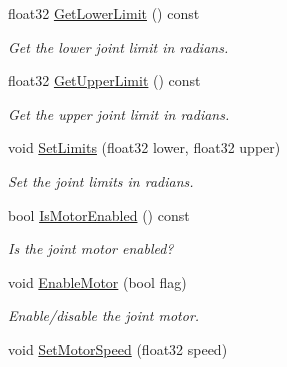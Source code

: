 \begin{DoxyCompactItemize}
float32 \mbox{\hyperlink{classb2RevoluteJoint_a1e34ad0cc3289d90bff8140c5d6261d2}{Get\+Lower\+Limit}} () const
\begin{DoxyCompactList}\small\item\em Get the lower joint limit in radians. \end{DoxyCompactList}\item 
\mbox{\label{classb2RevoluteJoint_a5c30cf83116841607d4d819985732efb}} 
float32 \mbox{\hyperlink{classb2RevoluteJoint_a5c30cf83116841607d4d819985732efb}{Get\+Upper\+Limit}} () const
\begin{DoxyCompactList}\small\item\em Get the upper joint limit in radians. \end{DoxyCompactList}\item 
\mbox{\label{classb2RevoluteJoint_a32f9393d8a6b993fd523f0f643c28107}} 
void \mbox{\hyperlink{classb2RevoluteJoint_a32f9393d8a6b993fd523f0f643c28107}{Set\+Limits}} (float32 lower, float32 upper)
\begin{DoxyCompactList}\small\item\em Set the joint limits in radians. \end{DoxyCompactList}\item 
\mbox{\label{classb2RevoluteJoint_a37d5744e89991ebe01b974c4d15a21b5}} 
bool \mbox{\hyperlink{classb2RevoluteJoint_a37d5744e89991ebe01b974c4d15a21b5}{Is\+Motor\+Enabled}} () const
\begin{DoxyCompactList}\small\item\em Is the joint motor enabled? \end{DoxyCompactList}\item 
\mbox{\label{classb2RevoluteJoint_a80ed5a07d9a0e07d010808a73ffae6ff}} 
void \mbox{\hyperlink{classb2RevoluteJoint_a80ed5a07d9a0e07d010808a73ffae6ff}{Enable\+Motor}} (bool flag)
\begin{DoxyCompactList}\small\item\em Enable/disable the joint motor. \end{DoxyCompactList}\item 
\mbox{\label{classb2RevoluteJoint_a56f60bb1ea69048c8a455da49d62bf65}} 
void \mbox{\hyperlink{classb2RevoluteJoint_a56f60bb1ea69048c8a455da49d62bf65}{Set\+Motor\+Speed}} (float32 speed)

\end{DoxyCompactItemize}
